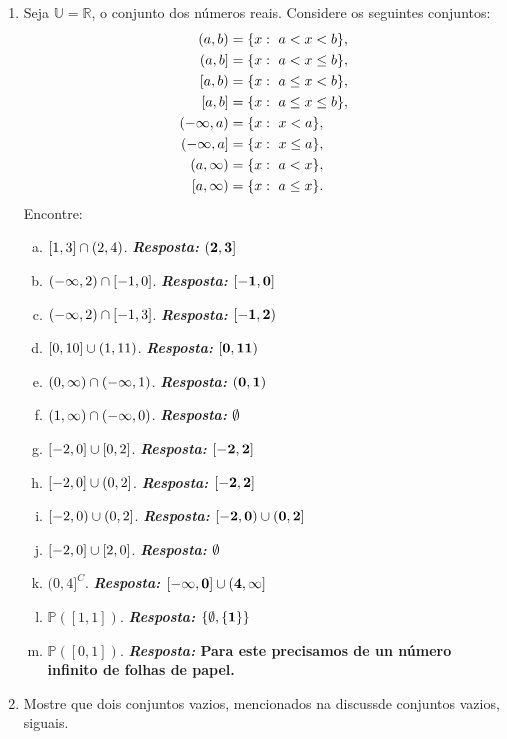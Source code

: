 \begin{enumerate}[{\bf 1.}]
\item Seja $\mathbb{U}=\mathbb{R}$, o conjunto dos n\'umeros reais. Considere os seguintes conjuntos:
\begin{equation*}
 \begin{aligned}
(a,b)&=\{x:\espaco a<x<b\},\\
(a,b]&=\{x:\espaco a<x\leq b\},\\
[a,b)&=\{x:\espaco a\leq x< b\},\\
[a,b]&=\{x:\espaco a\leq x\leq b\},\\
(-\infty,a)&=\{x:\espaco x<a\},\\
(-\infty,a]&=\{x:\espaco x\leq a\},\\
(a,\infty)&=\{x:\espaco a<x\},\\
[a,\infty)&=\{x:\espaco a\leq x\}.
 \end{aligned}
\end{equation*}
Encontre:
\begin{enumerate}[a)]
\item $[1,3]\cap(2,4)$. {\bf{\it Resposta:} ${\bf (2,3]}$}
\item $(-\infty,2)\cap[-1,0]$. {\bf{\it Resposta:} ${\bf [-1,0]}$}
\item $(-\infty,2)\cap[-1,3]$. {\bf{\it Resposta:} ${\bf [-1,2)}$}
\item $[0,10]\cup(1,11)$. {\bf{\it Resposta:} ${\bf [0,11)}$}
\item $(0,\infty)\cap(-\infty,1)$. {\bf{\it Resposta:} ${\bf (0,1)}$}
\item $(1,\infty)\cap(-\infty,0)$. {\bf{\it Resposta:} ${\bf \emptyset}$}
\item $[-2,0]\cup[0,2]$. {\bf{\it Resposta:} ${\bf [-2,2]}$}
\item $[-2,0]\cup(0,2]$. {\bf{\it Resposta:} ${\bf [-2,2]}$}
\item $[-2,0)\cup(0,2]$. {\bf{\it Resposta:} ${\bf [-2,0)\cup(0,2]}$}
\item $[-2,0]\cup[2,0]$. {\bf{\it Resposta:} ${\bf \emptyset}$}
\item $(0,4]^C$. {\bf{\it Resposta:} ${\bf [-\infty,0]\cup(4,\infty]}$}
\item $\mathbb{P}([1,1])$. {\bf{\it Resposta:} ${\bf \{\emptyset,\{1\}\}}$}
\item $\mathbb{P}([0,1])$. {\bf{\it Resposta:} Para este precisamos de un n\'umero infinito de folhas de papel.}
\end{enumerate}

\item Mostre que dois conjuntos vazios, mencionados na discuss\ao de conjuntos vazios, s\ao iguais.


\end{enumerate}

